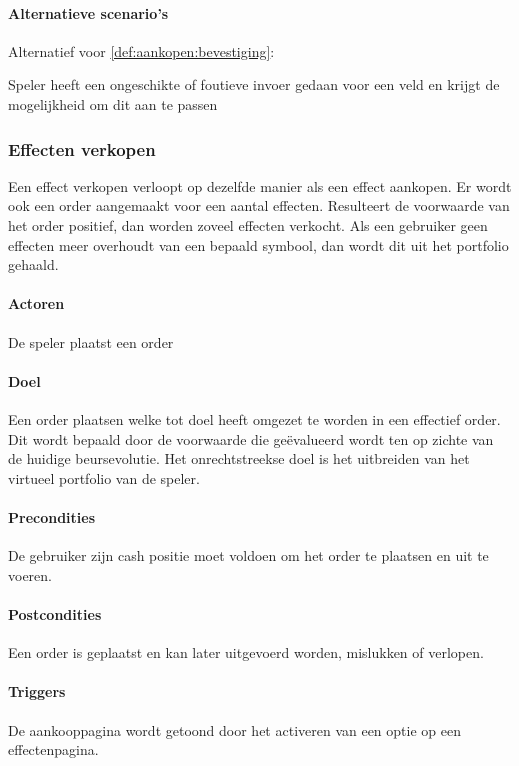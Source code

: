 \begin{compact}
\paragraph{Alternatieve scenario's}
Alternatief voor \ref{def:aankopen:bevestiging}:
\begin{enumerate_compact}
 \item Speler heeft een ongeschikte of foutieve invoer gedaan voor een veld en krijgt de mogelijkheid om dit aan te passen
\end{enumerate_compact}
\end{compact}

\subsubsection{Effecten verkopen}
\begin{compact}
Een effect verkopen verloopt op dezelfde manier als een effect aankopen. Er wordt ook een order aangemaakt voor een aantal effecten. Resulteert de voorwaarde van het order positief, dan worden zoveel effecten verkocht. Als een gebruiker geen effecten meer overhoudt van een bepaald symbool, dan wordt dit uit het portfolio gehaald.
\paragraph{Actoren} De speler plaatst een order
\paragraph{Doel} Een order plaatsen welke tot doel heeft omgezet te worden in een effectief order. Dit wordt bepaald door de voorwaarde die ge\"evalueerd wordt ten op zichte van de huidige beursevolutie. Het onrechtstreekse doel is het uitbreiden van het virtueel portfolio van de speler.
\paragraph{Precondities} De gebruiker zijn cash positie moet voldoen om het order te plaatsen en uit te voeren.
\paragraph{Postcondities} Een order is geplaatst en kan later uitgevoerd worden, mislukken of verlopen.
\paragraph{Triggers} De aankooppagina wordt getoond door het activeren van een optie op een effectenpagina.

\end{compact}
